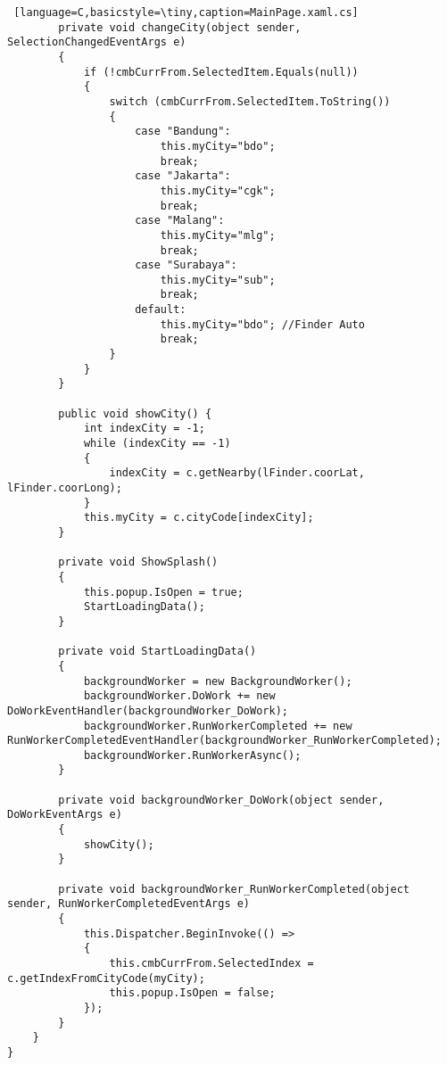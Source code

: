 \begin{lstlisting} [language=C,basicstyle=\tiny,caption=MainPage.xaml.cs]
        private void changeCity(object sender, SelectionChangedEventArgs e)
        {
            if (!cmbCurrFrom.SelectedItem.Equals(null))
            {
                switch (cmbCurrFrom.SelectedItem.ToString())
                {
                    case "Bandung":
                        this.myCity="bdo";
                        break;
                    case "Jakarta":
                        this.myCity="cgk";
                        break;
                    case "Malang":
                        this.myCity="mlg";
                        break;
                    case "Surabaya":
                        this.myCity="sub";
                        break;     
                    default:
                        this.myCity="bdo"; //Finder Auto
                        break;
                }
            }
        }

        public void showCity() {
            int indexCity = -1;
            while (indexCity == -1)
            {
                indexCity = c.getNearby(lFinder.coorLat, lFinder.coorLong);
            }
            this.myCity = c.cityCode[indexCity];
        }

        private void ShowSplash()
        {
            this.popup.IsOpen = true;
            StartLoadingData();
        }

        private void StartLoadingData()
        {
            backgroundWorker = new BackgroundWorker();
            backgroundWorker.DoWork += new DoWorkEventHandler(backgroundWorker_DoWork);
            backgroundWorker.RunWorkerCompleted += new RunWorkerCompletedEventHandler(backgroundWorker_RunWorkerCompleted);
            backgroundWorker.RunWorkerAsync();
        }

        private void backgroundWorker_DoWork(object sender, DoWorkEventArgs e)
        {
            showCity();
        }

        private void backgroundWorker_RunWorkerCompleted(object sender, RunWorkerCompletedEventArgs e)
        {
            this.Dispatcher.BeginInvoke(() =>
            {
                this.cmbCurrFrom.SelectedIndex = c.getIndexFromCityCode(myCity);
                this.popup.IsOpen = false;
            });
        }
    }
}
\end{lstlisting}

